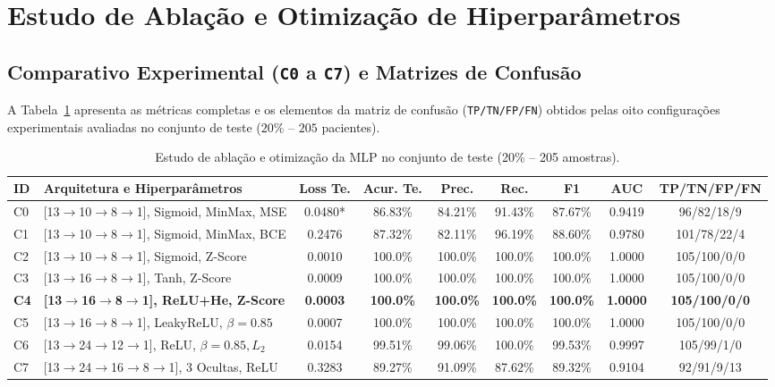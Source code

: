 \section{Estudo de Ablação e Otimização de Hiperparâmetros}
\label{sec:resultados}

\subsection{Comparativo Experimental (\texttt{C0} a \texttt{C7}) e Matrizes de Confusão}
A Tabela~\ref{tab:ablacao} apresenta as métricas completas e os elementos da matriz de confusão (\texttt{TP/TN/FP/FN}) obtidos pelas oito configurações experimentais avaliadas no conjunto de teste ($20\%$ -- $205$ pacientes).

\begin{table}[H]
\centering
\caption{Estudo de ablação e otimização da MLP no conjunto de teste (20\% -- 205 amostras).}
\label{tab:ablacao}
\footnotesize
\begin{tabular}{llccccccc}
\toprule
\textbf{ID} & \textbf{Arquitetura e Hiperparâmetros} & \textbf{Loss Te.} & \textbf{Acur. Te.} & \textbf{Prec.} & \textbf{Rec.} & \textbf{F1} & \textbf{AUC} & \textbf{TP/TN/FP/FN} \\
\midrule
C0 & {[13$\to$10$\to$8$\to$1]}, Sigmoid, MinMax, MSE & 0.0480* & 86.83\% & 84.21\% & 91.43\% & 87.67\% & 0.9419 & 96/82/18/9 \\
C1 & {[13$\to$10$\to$8$\to$1]}, Sigmoid, MinMax, BCE & 0.2476 & 87.32\% & 82.11\% & 96.19\% & 88.60\% & 0.9780 & 101/78/22/4 \\
C2 & {[13$\to$10$\to$8$\to$1]}, Sigmoid, Z-Score & 0.0010 & 100.0\% & 100.0\% & 100.0\% & 100.0\% & 1.0000 & 105/100/0/0 \\
C3 & {[13$\to$16$\to$8$\to$1]}, Tanh, Z-Score & 0.0009 & 100.0\% & 100.0\% & 100.0\% & 100.0\% & 1.0000 & 105/100/0/0 \\
\textbf{C4} & \textbf{{[13$\to$16$\to$8$\to$1]}, ReLU+He, Z-Score} & \textbf{0.0003} & \textbf{100.0\%} & \textbf{100.0\%} & \textbf{100.0\%} & \textbf{100.0\%} & \textbf{1.0000} & \textbf{105/100/0/0} \\
C5 & {[13$\to$16$\to$8$\to$1]}, LeakyReLU, $\beta=0.85$ & 0.0007 & 100.0\% & 100.0\% & 100.0\% & 100.0\% & 1.0000 & 105/100/0/0 \\
C6 & {[13$\to$24$\to$12$\to$1]}, ReLU, $\beta=0.85, L_2$ & 0.0154 & 99.51\% & 99.06\% & 100.0\% & 99.53\% & 0.9997 & 105/99/1/0 \\
C7 & {[13$\to$24$\to$16$\to$8$\to$1]}, 3 Ocultas, ReLU & 0.3283 & 89.27\% & 91.09\% & 87.62\% & 89.32\% & 0.9104 & 92/91/9/13 \\
\bottomrule
\end{tabular}
\end{table}

